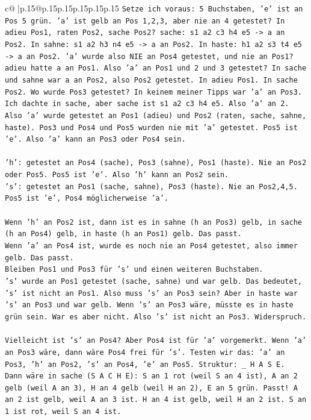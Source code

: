 \documentclass{article}
\begin{document}
{\begin{supertabular}{c@{$\;$}|p{.15\linewidth}@{}p{.15\linewidth}p{.15\linewidth}p{.15\linewidth}p{.15\linewidth}p{.15\linewidth}}
{{{\texttt{Setze ich voraus: 5 Buchstaben, 'e' ist an Pos 5 grün. 'a' ist gelb an Pos 1,2,3, aber nie an 4 getestet? In adieu Pos1, raten Pos2, sache Pos2? sache: s1 a2 c3 h4 e5 {-}> a an Pos2. In sahne: s1 a2 h3 n4 e5 {-}> a an Pos2. In haste: h1 a2 s3 t4 e5 {-}> a an Pos2. 'a' wurde also NIE an Pos4 getestet, und nie an Pos1? adieu hatte a an Pos1. Also 'a' an Pos1 und 2 und 3 getestet? In sache und sahne war a an Pos2, also Pos2 getestet. In adieu Pos1. In sache Pos2. Wo wurde Pos3 getestet? In keinem meiner Tipps war 'a' an Pos3. Ich dachte in sache, aber sache ist s1 a2 c3 h4 e5. Also 'a' an 2. Also 'a' wurde getestet an Pos1 (adieu) und Pos2 (raten, sache, sahne, haste). Pos3 und Pos4 und Pos5 wurden nie mit 'a' getestet. Pos5 ist 'e'. Also 'a' kann an Pos3 oder Pos4 sein. } \\
\\ 
\texttt{'h': getestet an Pos4 (sache), Pos3 (sahne), Pos1 (haste). Nie an Pos2 oder Pos5. Pos5 ist 'e'. Also 'h' kann an Pos2 sein.} \\
\texttt{'s': getestet an Pos1 (sache, sahne), Pos3 (haste). Nie an Pos2,4,5. Pos5 ist 'e', Pos4 möglicherweise 'a'. } \\
\\ 
\texttt{Wenn 'h' an Pos2 ist, dann ist es in sahne (h an Pos3) gelb, in sache (h an Pos4) gelb, in haste (h an Pos1) gelb. Das passt.} \\
\texttt{Wenn 'a' an Pos4 ist, wurde es noch nie an Pos4 getestet, also immer gelb. Das passt.} \\
\texttt{Bleiben Pos1 und Pos3 für 's' und einen weiteren Buchstaben.} \\
\texttt{'s' wurde an Pos1 getestet (sache, sahne) und war gelb. Das bedeutet, 's' ist nicht an Pos1. Also muss 's' an Pos3 sein? Aber in haste war 's' an Pos3 und war gelb. Wenn 's' an Pos3 wäre, müsste es in haste grün sein. War es aber nicht. Also 's' ist nicht an Pos3. Widerspruch.} \\
\\ 
\texttt{Vielleicht ist 's' an Pos4? Aber Pos4 ist für 'a' vorgemerkt. Wenn 'a' an Pos3 wäre, dann wäre Pos4 frei für 's'. Testen wir das: 'a' an Pos3, 'h' an Pos2, 's' an Pos4, 'e' an Pos5. Struktur: \_ H A S E. } \\
\texttt{Dann wäre in sache (S A C H E): S an 1 rot (weil S an 4 ist), A an 2 gelb (weil A an 3), H an 4 gelb (weil H an 2), E an 5 grün. Passt! A an 2 ist gelb, weil A an 3 ist. H an 4 ist gelb, weil H an 2 ist. S an 1 ist rot, weil S an 4 ist.} \\
}}}
\end{supertabular}}
\end{document}
